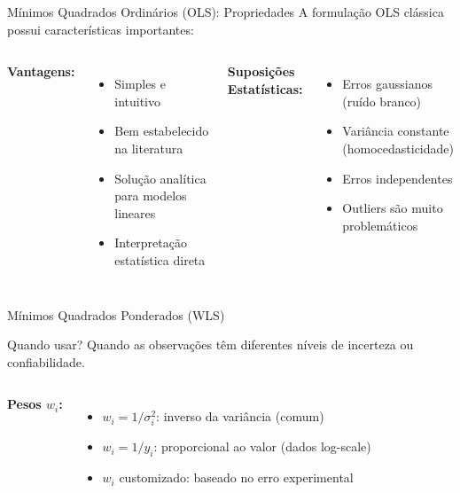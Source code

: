 \begin{frame}{Mínimos Quadrados Ordinários (OLS): Propriedades}
A formulação OLS clássica possui características importantes:

\begin{columns}
\textbf{Vantagens:}
\begin{itemize}\small
    \item Simples e intuitivo
    \item Bem estabelecido na literatura
    \item Solução analítica para modelos lineares
    \item Interpretação estatística direta
\end{itemize}

\textbf{Suposições Estatísticas:}
\begin{itemize}\small
    \item Erros gaussianos (ruído branco)
    \item Variância constante (homocedasticidade)
    \item Erros independentes
    \item Outliers são muito problemáticos
\end{itemize}
\end{columns}
\end{frame}

\begin{frame}{Mínimos Quadrados Ponderados (WLS)}
\begin{block}{Quando usar?}
Quando as observações têm diferentes níveis de incerteza ou confiabilidade.
\end{block}


\begin{columns}
\textbf{Pesos $w_i$:}
\begin{itemize}\small
    \item $w_i = 1/\sigma_i^2$: inverso da variância (comum)
    \item $w_i = 1/y_i$: proporcional ao valor (dados log-scale)
    \item $w_i$ customizado: baseado no erro experimental
\end{itemize}

\end{columns}
\end{frame}

